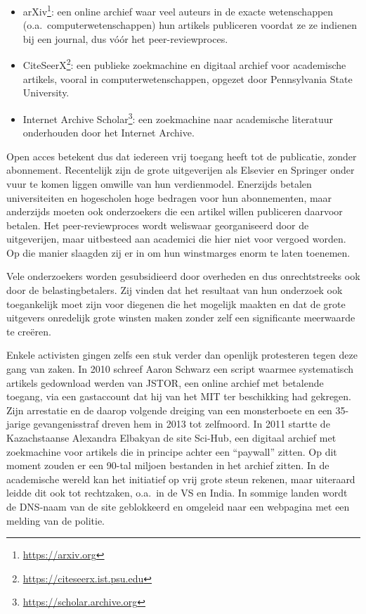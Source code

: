 \begin{itemize}
  \item arXiv\footnote{\url{https://arxiv.org}}: een online archief waar veel auteurs in de exacte wetenschappen (o.a.\ computerwetenschappen) hun artikels publiceren voordat ze ze indienen bij een journal, dus vóór het peer-reviewproces.
  \item CiteSeerX\footnote{\url{https://citeseerx.ist.psu.edu}}: een publieke zoekmachine en digitaal archief voor academische artikels, vooral in computerwetenschappen, opgezet door Pennsylvania State University.
  \item Internet Archive Scholar\footnote{\url{https://scholar.archive.org}}: een zoekmachine naar academische literatuur onderhouden door het Internet Archive.
\end{itemize}

Open acces betekent dus dat iedereen vrij toegang heeft tot de publicatie, zonder abonnement. Recentelijk zijn de grote uitgeverijen als Elsevier en Springer onder vuur te komen liggen omwille van hun verdienmodel. Enerzijds betalen universiteiten en hogescholen hoge bedragen voor hun abonnementen, maar anderzijds moeten ook onderzoekers die een artikel willen publiceren daarvoor betalen. Het peer-reviewproces wordt weliswaar georganiseerd door de uitgeverijen, maar uitbesteed aan academici die hier niet voor vergoed worden. Op die manier slaagden zij er in om hun winstmarges enorm te laten toenemen. 

Vele onderzoekers worden gesubsidieerd door overheden en dus onrechtstreeks ook door de belastingbetalers. Zij vinden dat het resultaat van hun onderzoek ook toegankelijk moet zijn voor diegenen die het mogelijk maakten en dat de grote uitgevers onredelijk grote winsten maken zonder zelf een significante meerwaarde te creëren.

Enkele activisten gingen zelfs een stuk verder dan openlijk protesteren tegen deze gang van zaken. In 2010 schreef Aaron Schwarz een script waarmee systematisch artikels gedownload werden van JSTOR, een online archief met betalende toegang, via een gastaccount dat hij van het MIT ter beschikking had gekregen. Zijn arrestatie en de daarop volgende dreiging van een monsterboete en een 35-jarige gevangenisstraf dreven hem in 2013 tot zelfmoord. In 2011 startte de Kazachstaanse Alexandra Elbakyan de site Sci-Hub, een digitaal archief met zoekmachine voor artikels die in principe achter een ``paywall'' zitten. Op dit moment zouden er een 90-tal miljoen bestanden in het archief zitten. In de academische wereld kan het initiatief op vrij grote steun rekenen, maar uiteraard leidde dit ook tot rechtzaken, o.a.\ in de VS en India. In sommige landen wordt de DNS-naam van de site geblokkeerd en omgeleid naar een webpagina met een melding van de politie.

